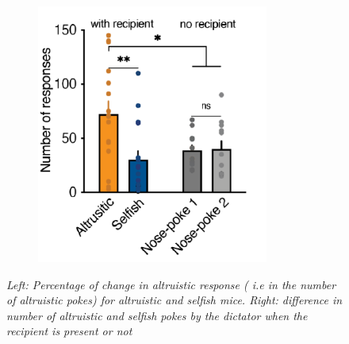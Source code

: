 \documentclass[a4paper]{article}
\begin{document}
\begin{figure}[H]
\begin{minipage}{\linewidth}
\begin{minipage}{0.46\linewidth}
\begin{figure}[H]
			\end{figure}
		\end{minipage}
		\hspace{0.05\linewidth}
		\begin{minipage}{0.46\linewidth}
			\begin{figure}[H]
				\includegraphics[width=\linewidth]{norecip.png}
				
			\end{figure}
		\end{minipage}
		
	\end{minipage}
	\caption{\textit{Left: Percentage of change in altruistic response ( i.e in the number of altruistic pokes) for altruistic and selfish mice. Right: difference in number of altruistic and selfish pokes by the dictator when the recipient is present or not}}
\end{figure}
\end{document}
